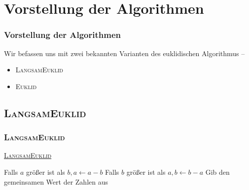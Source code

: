 \documentclass[•]{beamer}
\begin{document}
\section{Vorstellung der Algorithmen}
\begin{frame}
	\frametitle{Vorstellung der Algorithmen}
	Wir befassen uns mit zwei bekannten Varianten des euklidischen Algorithmus --
	
	\begin{itemize}
	\item \textsc{LangsamEuklid}
	\item \textsc{Euklid}
	\end{itemize}
\end{frame}


\subsection{\textsc{LangsamEuklid}}
\begin{frame}
	\frametitle{\textsc{LangsamEuklid}}
	\underline{\textsc{LangsamEuklid}}
	\begin{algorithmic}[1]
	\State Falls $a$ gr\"o{\ss}er ist als $b, a\gets a-b$
	\State Falls $b$ gr\"o{\ss}er ist als $a, b\gets b-a$
\EndWhile
	\State Gib den gemeinsamen Wert der Zahlen aus
\end{algorithmic}
\end{frame}
\end{document}
